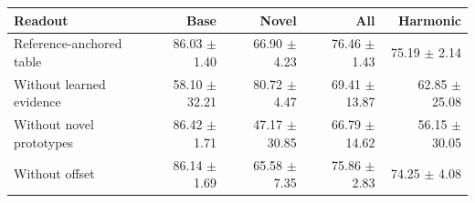 \begin{tabular}{lrrrr}
\toprule
Readout & Base & Novel & All & Harmonic \\
\midrule
Reference-anchored table & 86.03 $\pm$ 1.40 & 66.90 $\pm$ 4.23 & 76.46 $\pm$ 1.43 & 75.19 $\pm$ 2.14 \\
Without learned evidence & 58.10 $\pm$ 32.21 & 80.72 $\pm$ 4.47 & 69.41 $\pm$ 13.87 & 62.85 $\pm$ 25.08 \\
Without novel prototypes & 86.42 $\pm$ 1.71 & 47.17 $\pm$ 30.85 & 66.79 $\pm$ 14.62 & 56.15 $\pm$ 30.05 \\
Without offset & 86.14 $\pm$ 1.69 & 65.58 $\pm$ 7.35 & 75.86 $\pm$ 2.83 & 74.25 $\pm$ 4.08 \\
\bottomrule
\end{tabular}